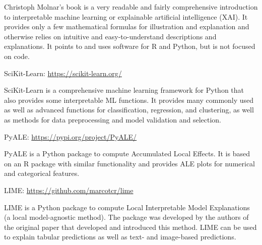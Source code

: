 Christoph Molnar's book is a very readable and fairly comprehensive introduction to interpretable machine learning or explainable artificial intelligence (XAI). It provides only a few mathematical formulas for illustration and explanation and otherwise relies on intuitive and easy-to-understand descriptions and explanations. It points to and uses software for R and Python, but is not focused on code.

\begin{resourcebox}
\vspace{\baselineskip}

SciKit-Learn: \small\url{https://scikit-learn.org/}\normalsize

\vspace{\baselineskip}
\end{resourcebox}

SciKit-Learn is a comprehensive machine learning framework for Python that also provides some interpretable ML functions. It provides many commonly used as well as advanced functions for classification, regression, and clustering, as well as methods for data preprocessing and model validation and selection.

\begin{resourcebox}
\vspace{\baselineskip}

PyALE: \small\url{https://pypi.org/project/PyALE/}\normalsize

\vspace{\baselineskip}
\end{resourcebox}

PyALE is a Python package to compute Accumulated Local Effects. It is based on an R package with similar functionality and provides ALE plots for numerical and categorical features.

\begin{resourcebox}
\vspace{\baselineskip}

LIME: \small\url{https://github.com/marcotcr/lime}\normalsize

\vspace{\baselineskip}
\end{resourcebox}

LIME is a Python package to compute Local Interpretable Model Explanations (a local model-agnostic method). The package was developed by the authors of the original paper that developed and introduced this method. LIME can be used to explain tabular predictions as well as text- and image-based predictions.

